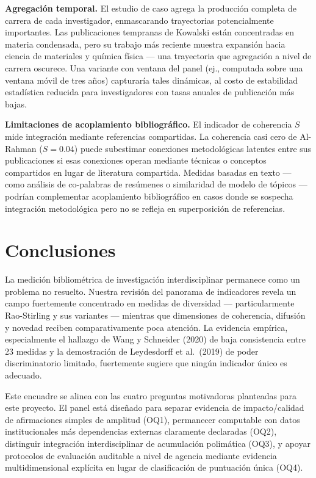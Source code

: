 \documentclass[
]{article}
\begin{document}
\textbf{Agregación temporal.} El estudio de caso agrega la producción
completa de carrera de cada investigador, enmascarando trayectorias
potencialmente importantes. Las publicaciones tempranas de Kowalski
están concentradas en materia condensada, pero su trabajo más reciente
muestra expansión hacia ciencia de materiales y química física --- una
trayectoria que agregación a nivel de carrera oscurece. Una variante con
ventana del panel (ej., computada sobre una ventana móvil de tres años)
capturaría tales dinámicas, al costo de estabilidad estadística reducida
para investigadores con tasas anuales de publicación más bajas.

\textbf{Limitaciones de acoplamiento bibliográfico.} El indicador de
coherencia \(S\) mide integración mediante referencias compartidas. La
coherencia casi cero de Al-Rahman (\(S = 0.04\)) puede subestimar
conexiones metodológicas latentes entre sus publicaciones si esas
conexiones operan mediante técnicas o conceptos compartidos en lugar de
literatura compartida. Medidas basadas en texto --- como análisis de
co-palabras de resúmenes o similaridad de modelo de tópicos --- podrían
complementar acoplamiento bibliográfico en casos donde se sospecha
integración metodológica pero no se refleja en superposición de
referencias.

\hypertarget{conclusiones}{%
\section{Conclusiones}\label{conclusiones}}

La medición bibliométrica de investigación interdisciplinar permanece
como un problema no resuelto. Nuestra revisión del panorama de
indicadores revela un campo fuertemente concentrado en medidas de
diversidad --- particularmente Rao-Stirling y sus variantes --- mientras
que dimensiones de coherencia, difusión y novedad reciben
comparativamente poca atención. La evidencia empírica, especialmente el
hallazgo de Wang y Schneider (2020) de baja consistencia entre 23
medidas y la demostración de Leydesdorff et al.~(2019) de poder
discriminatorio limitado, fuertemente sugiere que ningún indicador único
es adecuado.

Este encuadre se alinea con las cuatro preguntas motivadoras planteadas
para este proyecto. El panel está diseñado para separar evidencia de
impacto/calidad de afirmaciones simples de amplitud (OQ1), permanecer
computable con datos institucionales más dependencias externas
claramente declaradas (OQ2), distinguir integración interdisciplinar de
acumulación polimática (OQ3), y apoyar protocolos de evaluación
auditable a nivel de agencia mediante evidencia multidimensional
explícita en lugar de clasificación de puntuación única (OQ4).
\end{document}
